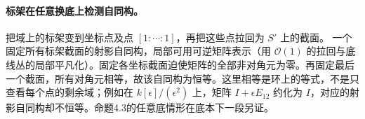 \documentclass[openany,fontset=fandol]{ctexbook}
\newcommand{\OO}{\mathcal O}
\begin{document}
\paragraph{标架在任意换底上检测自同构。}
把域上的标架变到坐标点及点 \([1:\cdots:1]\)，再把这些点拉回为 \(S'\) 上的截面。
一个固定所有标架截面的射影自同构，局部可用可逆矩阵表示（用 \(\OO(1)\) 的拉回与底线丛的局部平凡化）。固定各坐标截面迫使矩阵的全部非对角元为零。再固定最后一个截面，所有对角元相等，故该自同构为恒等。这里相等是环上的等式，不是只查看每个点的剩余域；例如在 \(k[\epsilon]/(\epsilon^2)\) 上，矩阵 \(I+\epsilon E_{12}\) 约化为 \(I\)，对应的射影自同构却不恒等。命题4.3的任意底情形在底本下一段另证。
\end{document}
